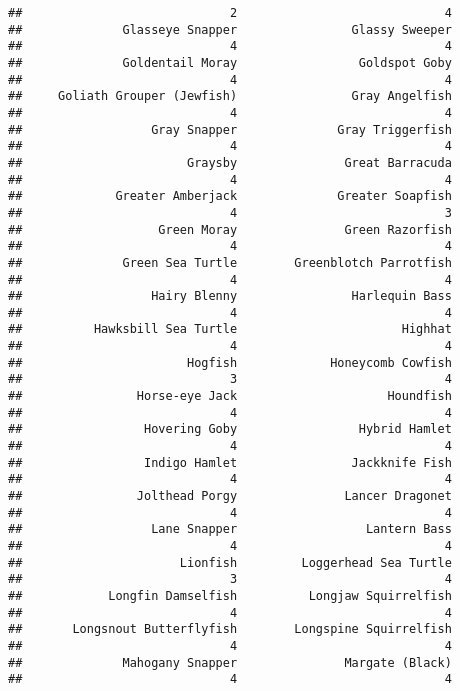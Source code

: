 \documentclass[
]{article}
\begin{document}
\begin{verbatim}
##                             2                             4 
##              Glasseye Snapper                Glassy Sweeper 
##                             4                             4 
##              Goldentail Moray                 Goldspot Goby 
##                             4                             4 
##     Goliath Grouper (Jewfish)                Gray Angelfish 
##                             4                             4 
##                  Gray Snapper              Gray Triggerfish 
##                             4                             4 
##                       Graysby               Great Barracuda 
##                             4                             4 
##             Greater Amberjack              Greater Soapfish 
##                             4                             3 
##                   Green Moray               Green Razorfish 
##                             4                             4 
##              Green Sea Turtle        Greenblotch Parrotfish 
##                             4                             4 
##                  Hairy Blenny                Harlequin Bass 
##                             4                             4 
##          Hawksbill Sea Turtle                       Highhat 
##                             4                             4 
##                       Hogfish             Honeycomb Cowfish 
##                             3                             4 
##                Horse-eye Jack                     Houndfish 
##                             4                             4 
##                 Hovering Goby                 Hybrid Hamlet 
##                             4                             4 
##                 Indigo Hamlet                Jackknife Fish 
##                             4                             4 
##                Jolthead Porgy               Lancer Dragonet 
##                             4                             4 
##                  Lane Snapper                  Lantern Bass 
##                             4                             4 
##                      Lionfish         Loggerhead Sea Turtle 
##                             3                             4 
##            Longfin Damselfish          Longjaw Squirrelfish 
##                             4                             4 
##       Longsnout Butterflyfish        Longspine Squirrelfish 
##                             4                             4 
##              Mahogany Snapper               Margate (Black) 
##                             4                             4 

\end{verbatim}
\end{document}

